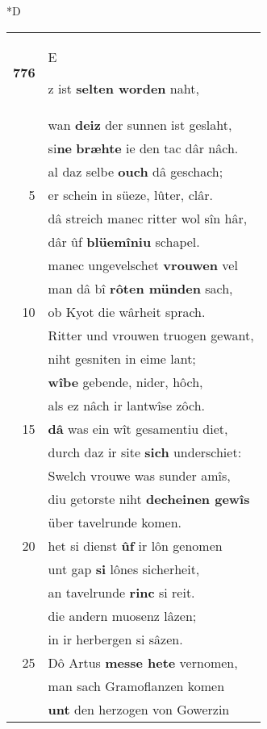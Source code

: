 \documentclass[8pt,a4paper,notitlepage]{article}
\begin{document}
\begin{table}[ht]
\begin{minipage}[t]{0.5\linewidth}
\small
\begin{center}*D
\end{center}
\begin{tabular}{rl}
\textbf{776} & \begin{large}E\end{large}z ist \textbf{selten worden} naht,\\ 
 & wan \textbf{deiz} der sunnen ist geslaht,\\ 
 & si\textbf{ne} \textbf{bræhte} ie den tac dâr nâch.\\ 
 & al daz selbe \textbf{ouch} dâ geschach;\\ 
5 & er schein in süeze, lûter, clâr.\\ 
 & dâ streich manec ritter wol sîn hâr,\\ 
 & dâr ûf \textbf{blüemîniu} schapel.\\ 
 & manec ungevelschet \textbf{vrouwen} vel\\ 
 & man dâ bî \textbf{rôten münden} sach,\\ 
10 & ob Kyot die wârheit sprach.\\ 
 & Ritter und vrouwen truogen gewant,\\ 
 & niht gesniten in eime lant;\\ 
 & \textbf{wîbe} gebende, nider, hôch,\\ 
 & als ez nâch ir lantwîse zôch.\\ 
15 & \textbf{dâ} was ein wît gesamentiu diet,\\ 
 & durch daz ir site \textbf{sich} underschiet:\\ 
 & Swelch vrouwe was sunder amîs,\\ 
 & diu getorste niht \textbf{decheinen gewîs}\\ 
 & über tavelrunde komen.\\ 
20 & het si dienst \textbf{ûf} ir lôn genomen\\ 
 & unt gap \textbf{si} lônes sicherheit,\\ 
 & an tavelrunde \textbf{rinc} si reit.\\ 
 & die andern muosenz lâzen;\\ 
 & in ir herbergen si sâzen.\\ 
25 & Dô Artus \textbf{messe hete} vernomen,\\ 
 & man sach Gramoflanzen komen\\ 
 & \textbf{unt} den herzogen von Gowerzin\\ 

\end{tabular}
\end{minipage}
\end{table}
\end{document}
